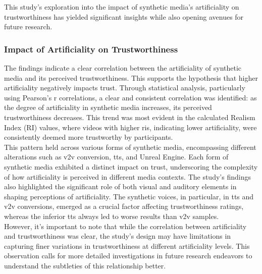 \documentclass[
  a4paper,  %
  twoside,  %
  bibliography=totoc,
  headsepline,
  cleardoublepage=empty,
  parskip=half,
  draft=false
]{scrbook}
\begin{document}
This study's exploration into the impact of synthetic media's artificiality on trustworthiness has yielded significant insights while also opening avenues for future research.

\subsubsection{Impact of Artificiality on Trustworthiness}
The findings indicate a clear correlation between the artificiality of synthetic media and its perceived trustworthiness. This supports the hypothesis that higher artificiality negatively impacts trust. Through statistical analysis, particularly using Pearson's r correlations, a clear and consistent correlation was identified: as the degree of artificiality in synthetic media increases, its perceived trustworthiness decreases. This trend was most evident in the calculated Realism Index (RI) values, where videos with higher \gls{ri}s, indicating lower artificiality, were consistently deemed more trustworthy by participants. \\
This pattern held across various forms of synthetic media, encompassing different alterations such as \gls{v2v} conversion, \gls{tts}, and Unreal Engine. Each form of synthetic media exhibited a distinct impact on trust, underscoring the complexity of how artificiality is perceived in different media contexts. The study's findings also highlighted the significant role of both visual and auditory elements in shaping perceptions of artificiality. The synthetic voices, in particular, in \gls{tts} and \gls{v2v} conversions, emerged as a crucial factor affecting trustworthiness ratings, whereas the inferior \gls{tts} always led to worse results than \gls{v2v} samples. \\
However, it's important to note that while the correlation between artificiality and trustworthiness was clear, the study's design may have limitations in capturing finer variations in trustworthiness at different artificiality levels. This observation calls for more detailed investigations in future research endeavors to understand the subtleties of this relationship better.
\end{document}
